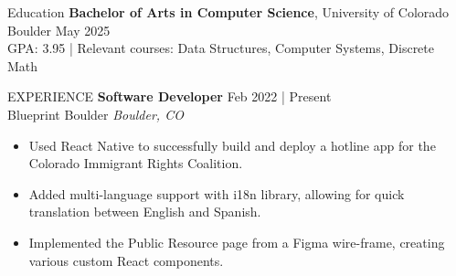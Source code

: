 \documentclass{resume} %
\begin{document}
\begin{rSection}{Education}
    {\bf Bachelor of Arts in Computer Science}, University of Colorado Boulder \hfill {May 2025}\\
    GPA: 3.95 | Relevant courses: Data Structures, Computer Systems, Discrete Math
\end{rSection}

\begin{rSection}{EXPERIENCE}
    \textbf{Software Developer} \hfill Feb 2022 | Present\\
    Blueprint Boulder \hfill \textit{Boulder, CO}
    \begin{itemize}
    \itemsep -3pt {} 
        \item Used React Native to successfully build and deploy a hotline app for the Colorado Immigrant Rights Coalition. 
        \item Added multi-language support with i18n library, allowing for quick translation between English and Spanish.
        \item Implemented the Public Resource page from a Figma wire-frame, creating various custom React components.
    \end{itemize}
\end{rSection}
\end{document}
